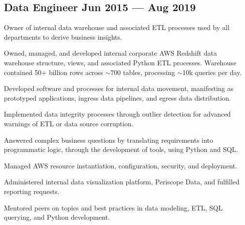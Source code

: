 \documentclass[letter,10pt]{article}
\begin{document}
\vspace{5pt}
\vspace{5pt}

\subsection{{Data Engineer \hfill Jun 2015 --- Aug 2019}}

\vspace{10pt}

Owner of internal data warehouse and associated ETL processes used by all departments to derive business insights.


\vspace{10pt}

\begin{zitemize}
    \item Owned, managed, and developed internal corporate AWS Redshift data warehouse structure, views, and associated Python ETL processes. Warehouse contained 50+ billion rows across $\sim$700 tables, processing $\sim$10k queries per day.
    \item Developed software and processes for internal data movement, manifesting as prototyped applications, ingress data pipelines, and egress data distribution.
    \item Implemented data integrity processes through outlier detection for advanced warnings of ETL or data source corruption.
    \item Answered complex business questions by translating requirements into programmatic logic, through the development of tools, using Python and SQL.
    \item Managed AWS resource instantiation, configuration, security, and deployment.
    \item Administered internal data visualization platform, Periscope Data, and fulfilled reporting requests.
    \item Mentored peers on topics and best practices in data modeling, ETL, SQL querying, and Python development.
\end{zitemize}

\vspace{5pt}
\end{document}
